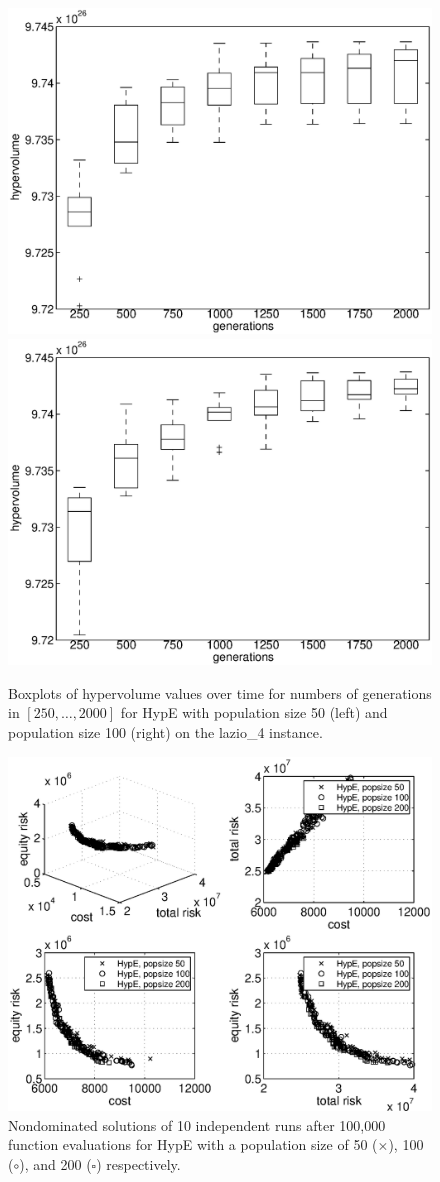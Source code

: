 \documentclass[preprint,12pt]{elsarticle}
\begin{document}
\begin{figure}
	\centering
	\includegraphics[width=0.48\columnwidth]{../experiments/randVsCost/hypervolumes/hypervolumeOverTime_50.eps}%
	\includegraphics[width=0.48\columnwidth]{../experiments/randVsCost/hypervolumes/hypervolumeOverTime_100.eps}%
	\caption{\label{fig:hypervolumeOverTime} Boxplots of hypervolume values over time for numbers of generations in $[250, \ldots, 2000]$ for HypE with population size 50 (left) and population size 100 (right) on the lazio\_4 instance.}
\end{figure}


\begin{figure}%
	\centering
	\includegraphics[width=0.75\columnwidth]{../experiments/randVsCost/diffPopsizes}%
	\vspace{-1em}
	\caption{\label{fig:popsizes} Nondominated solutions of 10 independent runs after 100,000 function evaluations for HypE with a population size of 50 ($\times$), 100 ($\circ$), and 200 ($\square$) respectively.}
\end{figure}
\end{document}
